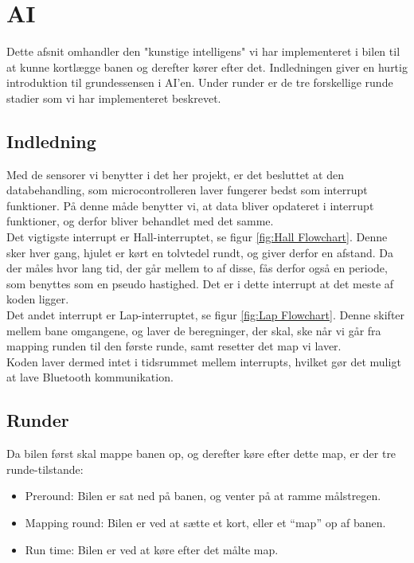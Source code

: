 \section{AI}
\label{sec:AI}
Dette afsnit omhandler den "kunstige intelligens" vi har implementeret i bilen til at kunne kortlægge banen og derefter kører efter det. Indledningen giver en hurtig introduktion til grundessensen i AI'en. Under runder er de tre forskellige runde stadier som vi har implementeret beskrevet.

\subsection{Indledning}
Med de sensorer vi benytter i det her projekt, er det besluttet at den databehandling, som microcontrolleren laver fungerer bedst som interrupt funktioner. På denne måde benytter vi, at data bliver opdateret i interrupt funktioner, og derfor bliver behandlet med det samme.
\\

Det vigtigste interrupt er Hall-interruptet, se figur \ref{fig:Hall Flowchart}. Denne sker hver gang, hjulet er kørt en tolvtedel rundt, og giver derfor en afstand. Da der måles hvor lang tid, der går mellem to af disse, fås derfor også en periode, som benyttes som en pseudo hastighed. Det er i dette interrupt at det meste af koden ligger.
\\

Det andet interrupt er Lap-interruptet, se figur \ref{fig:Lap Flowchart}. Denne skifter mellem bane omgangene, og laver de beregninger, der skal, ske når vi går fra mapping runden til den første runde, samt resetter det map vi laver.
\\

Koden laver dermed intet  i tidsrummet mellem interrupts, hvilket gør det muligt at lave Bluetooth kommunikation.

\subsection{Runder}

Da bilen først skal mappe banen op, og derefter køre efter dette map, er der tre runde-tilstande:

\begin{itemize}
\item Preround: Bilen er sat ned på banen, og venter på at ramme målstregen.
\item Mapping round: Bilen er ved at sætte et kort, eller et ``map'' op af banen.
\item Run time: Bilen er ved at køre efter det målte map.
\end{itemize}


